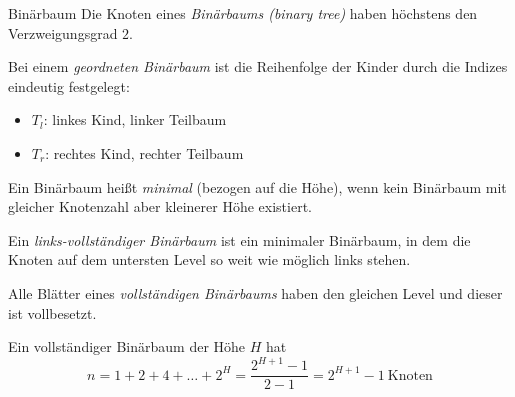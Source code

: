 
\begin{defi}{Binärbaum}
    Die Knoten eines \emph{Binärbaums (binary tree)} haben höchstens den Verzweigungsgrad $2$.

    Bei einem \emph{geordneten Binärbaum} ist die Reihenfolge der Kinder durch die Indizes eindeutig festgelegt:
    \begin{itemize}
        \item $T_l$: linkes Kind, linker Teilbaum
        \item $T_r$: rechtes Kind, rechter Teilbaum
    \end{itemize}

    Ein Binärbaum heißt \emph{minimal} (bezogen auf die Höhe), wenn kein Binärbaum mit gleicher Knotenzahl aber kleinerer Höhe existiert.

    Ein \emph{links-vollständiger Binärbaum} ist ein minimaler Binärbaum, in dem die Knoten auf dem untersten Level so weit wie möglich links stehen.

    Alle Blätter eines \emph{vollständigen Binärbaums} haben den gleichen Level und dieser ist vollbesetzt.

    Ein vollständiger Binärbaum der Höhe $H$ hat
    $$
        n = 1 + 2 + 4 + \ldots + 2^H = \frac{2^{H+1}-1}{2-1} = 2^{H+1}-1 \ \text{Knoten}
    $$
\end{defi}


